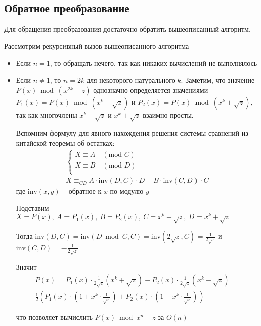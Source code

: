 \subsection{Обратное преобразование}
\label{inverse_fft}

Для обращения преобразования достаточно обратить вышеописанный алгоритм.

Рассмотрим рекурсивный вызов вышеописанного алгоритма
\begin{itemize}
    \item Если $n = 1$, то обращать нечего, так как никаких вычислений не выполнялось
    \item Если $n \neq 1$, то $n = 2k$ для некоторого натурального $k$. Заметим, что значение $P(x) \bmod (x^{2k} - z)$
          однозначно определяется значениями $P_1(x) = P(x) \bmod (x^k - \sqrt{z})$ и $P_2(x) = P(x) \bmod (x^k + \sqrt{z})$, так как многочлены $x^k - \sqrt{z}$ и $x^k + \sqrt{z}$ взаимно просты.

          Вспомним формулу для явного нахождения решения системы сравнений из китайской теоремы об остатках:
          \begin{gather}
              \begin{cases}
                  X \equiv A \quad (\text{mod } C) \\
                  X \equiv B \quad (\text{mod } D) \\
              \end{cases} \\
              X \equiv_{CD}
              A \cdot \text{inv}(D, C) \cdot D +
              B \cdot \text{inv}(C, D) \cdot C
          \end{gather}
          где $\text{inv}(x, y)$ -- обратное к $x$ по модулю $y$

          Подставим $X = P(x),\ A = P_1(x),\ B = P_2(x),\ C = x^k - \sqrt{z},\ D = x^k + \sqrt{z}$

          Тогда $\text{inv}(D, C) = \text{inv}(D \bmod C, C) = \text{inv}(2\sqrt{z}, C) = \frac{1}{2\sqrt{z}}$ и $\text{inv}(C, D) = -\frac{1}{2\sqrt{z}}$

          Значит
          \begin{gather}
              P(x) =
              P_1(x) \cdot \frac{1}{2\sqrt{z}} \left(x^k + \sqrt{z} \right) -
              P_2(x) \cdot \frac{1}{2\sqrt{z}} \left(x^k - \sqrt{z} \right) =
              \\
              \frac{1}{2} \left(
              P_1(x) \cdot  \left(1 + x^k \cdot \frac{1}{\sqrt{z}} \right) +
              P_2(x) \cdot  \left(1 - x^k \cdot \frac{1}{\sqrt{z}} \right)
              \right)
          \end{gather}

          что позволяет вычислить $P(x) \bmod x^n - z$ за $O(n)$
\end{itemize}


